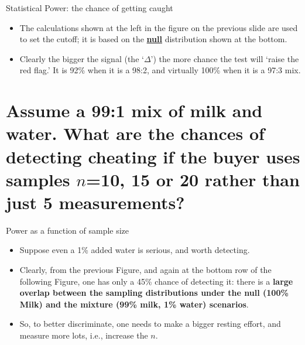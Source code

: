 \documentclass[10pt]{beamer}\usepackage[]{graphicx}\usepackage[]{color}
\begin{document}
\begin{frame}{Statistical Power: the chance of getting caught}
	\begin{itemize}
		\setlength\itemsep{1em}
		\item The calculations shown at the left in the figure on the previous slide are used to set  the cutoff; it is based on the \underline{\textbf{null}} distribution shown at the bottom. \pause  
		\item Clearly the bigger the signal (the `$\Delta$') the more chance the test will `raise the red flag.' It is 92\% when it is a 98:2, and virtually 100\% when it is a 97:3 mix.
	\end{itemize}
	
	
\end{frame}


\section{Assume a 99:1 mix of milk and water. What are the chances of detecting cheating if the buyer uses samples $n$=10, 15 or 20 rather than just 5 measurements?}

\begin{frame}{Power as a function of sample size}
	
	\begin{itemize}
		\setlength\itemsep{1em}
		\item Suppose even a 1\% added water is serious, and worth detecting.
		\item Clearly, from the previous Figure, and again at the bottom row of the following Figure,
		one has only a 45\% chance of detecting it: there is a \textbf{large overlap between the sampling distributions under the null (100\% Milk) and the mixture (99\% milk, 1\% water) scenarios}. \pause 
		
		\item So, to better discriminate, one needs to make a bigger resting effort, and measure more lots,
		i.e., increase the $n$.
	\end{itemize}
\end{frame}
\end{document}
